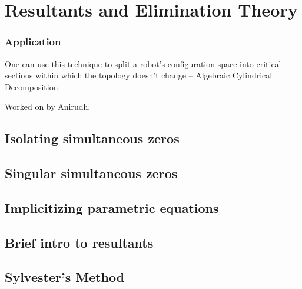 \chapter{Resultants and Elimination Theory}

\subsection*{Application}
One can use this technique to split a robot's configuration space into critical sections within which the topology doesn't change -- Algebraic Cylindrical Decomposition.

Worked on by Anirudh.

\section{Isolating simultaneous zeros}

\section{Singular simultaneous zeros}

\section{Implicitizing parametric equations}

\section{Brief intro to resultants}

\section{Sylvester's Method}

